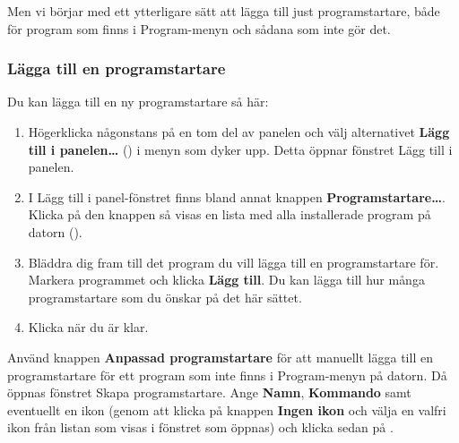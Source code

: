 \documentclass[a4paper,final]{memoir} %
\begin{document}
Men vi börjar med ett ytterligare sätt att lägga till just programstartare, både för program som finns i Program-menyn och sådana som inte gör det.

\subsubsection{Lägga till en programstartare}\label{panelprogram-programstartare}

Du kan lägga till en ny programstartare så här:

\begin{enumerate}

\item Högerklicka någonstans på en tom del av panelen och välj alternativet \textbf{Lägg till i panelen\ldots{}} () i menyn som dyker upp. Detta öppnar fönstret Lägg till i panelen.


\item I Lägg till i panel-fönstret finns bland annat knappen \textbf{Programstartare\ldots{}}. Klicka på den knappen så visas en lista med alla installerade program på datorn ().


\item Bläddra dig fram till det program du vill lägga till en programstartare för. Markera programmet och klicka \textbf{Lägg till}. Du kan lägga till hur många programstartare som du önskar på det här sättet.

\item Klicka \xstang{} när du är klar.

\end{enumerate}

Använd knappen \textbf{Anpassad programstartare} för att manuellt lägga till en programstartare för ett program som inte finns i Program-menyn på datorn. Då öppnas fönstret Skapa programstartare. Ange \textbf{Namn}, \textbf{Kommando} samt eventuellt en ikon (genom att klicka på knappen \textbf{Ingen ikon} och välja en valfri ikon från listan som visas i fönstret som öppnas) och klicka sedan på \xok{}.
\end{document}
